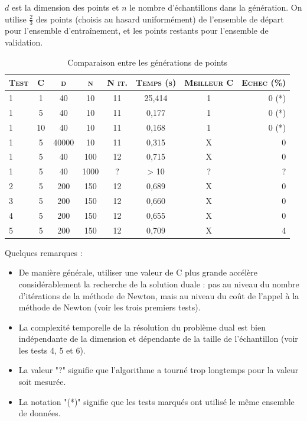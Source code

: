 \documentclass{article}
\begin{document}
$d$ est la dimension des points et $n$ le nombre d'échantillons dans la génération. On utilise $\frac{2}{3}$ des points (choisis au hasard uniformément) de l'ensemble de départ pour l'ensemble d'entraînement, et les points restants pour l'ensemble de validation. \\

     \begin{table}[H]
       \caption{Comparaison entre les générations de points}
       \begin{tabular}{|l|c|c|c|c|c|c|r|}
         \hline
         \textsc{Test} & \textsc{C} & \textsc{d} & \textsc{n} & \textsc{N it.} & \textsc{Temps (s)} & \textsc{Meilleur C} & \textsc{Echec (\%)}\\
         \hline
         1 & 1 & 40 & 10 & 11 & 25,414 & 1 & 0 (*)\\
         \hline
         1 & 5 & 40 & 10 & 11 & 0,177 & 1 & 0 (*)\\
         \hline
         1 & 10 & 40 & 10 & 11 & 0,168 & 1 & 0 (*)\\
         \hline
         1 & 5 & 40000 & 10 & 11 & 0,315 & X & 0\\
         \hline
         1 & 5 & 40 & 100 & 12 & 0,715 & X & 0\\
         \hline
         1 & 5 & 40 & 1000 & ? & > 10 & ? & ?\\
         \hline
         2 & 5 & 200 & 150 & 12 & 0,689 & X & 0\\
         \hline
         3 & 5 & 200 & 150 & 12 & 0,660 & X & 0\\
         \hline
         4 & 5 & 200 & 150 & 12 & 0,655 & X & 0\\
         \hline
         5 & 5 & 200 & 150 & 12 & 0,709 & X & 4\\
         \hline
       \end{tabular}
     \end{table}

Quelques remarques :
\begin{itemize}
\item De manière générale, utiliser une valeur de C plus grande accélère considérablement la recherche de la solution duale : pas au niveau du nombre d'itérations de la méthode de Newton, mais au niveau du coût de l'appel à la méthode de Newton (voir les trois premiers tests). 
\item La complexité temporelle de la résolution du problème dual est bien indépendante de la dimension et dépendante de la taille de l'échantillon (voir les tests 4, 5 et 6).
\item La valeur "?" signifie que l'algorithme a tourné trop longtemps pour la valeur soit mesurée.
\item La notation "(*)" signifie que les tests marqués ont utilisé le même ensemble de données.
\end{itemize}
\end{document}
